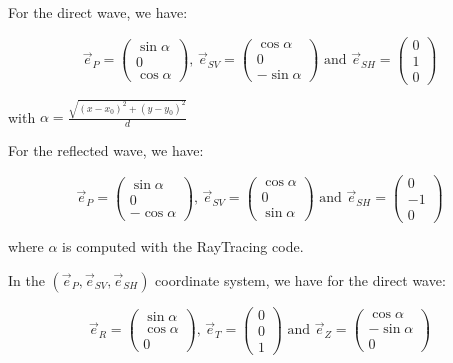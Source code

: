 \documentclass[methods.tex]{subfiles}
\begin{document}
For the direct wave, we have:

\begin{equation}
\vec{e}_P = \begin{pmatrix}
\sin \alpha \\
0 \\
\cos \alpha
\end{pmatrix} \text{, } \vec{e}_{SV} = \begin{pmatrix}
\cos \alpha \\
0 \\
- \sin \alpha
\end{pmatrix} \text{ and } \vec{e}_{SH} = \begin{pmatrix}
0 \\
1 \\
0
\end{pmatrix}
\end{equation}

with $\alpha = \frac{\sqrt{ (x - x_0)^2 + (y - y_0)^2}}{d}$

For the reflected wave, we have:

\begin{equation}
\vec{e}_P = \begin{pmatrix}
\sin \alpha \\
0 \\
- \cos \alpha
\end{pmatrix} \text{, } \vec{e}_{SV} = \begin{pmatrix}
\cos \alpha \\
0 \\
\sin \alpha
\end{pmatrix} \text{ and } \vec{e}_{SH} = \begin{pmatrix}
0 \\
- 1 \\
0
\end{pmatrix}
\end{equation}

where $\alpha$ is computed with the RayTracing code.

In the $(\vec{e}_P, \vec{e}_{SV}, \vec{e}_{SH})$ coordinate system, we have for the direct wave:

\begin{equation}
\vec{e}_R = \begin{pmatrix}
\sin \alpha \\
\cos \alpha \\
0
\end{pmatrix} \text{, } \vec{e}_T = \begin{pmatrix}
0 \\
0 \\
1
\end{pmatrix} \text{ and } \vec{e}_Z = \begin{pmatrix}
\cos \alpha \\
- \sin \alpha \\
0
\end{pmatrix}
\end{equation}
\end{document}
